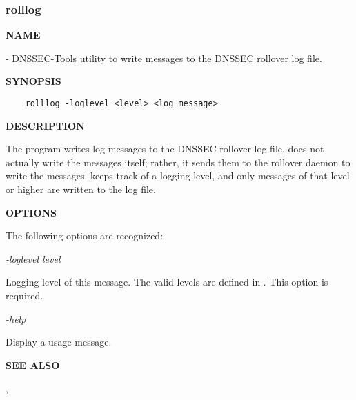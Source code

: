 \clearpage

\subsubsection{\bf rolllog}

{\bf NAME}

 - DNSSEC-Tools utility to write messages to the DNSSEC rollover
log file.

{\bf SYNOPSIS}

\begin{verbatim}
    rolllog -loglevel <level> <log_message>
\end{verbatim}

{\bf DESCRIPTION}

The  program writes log messages to the DNSSEC rollover log file.
 does not actually write the messages itself; rather, it sends
them to the  rollover daemon to write the messages.
 keeps track of a logging level, and only messages of that level
or higher are written to the log file.

{\bf OPTIONS}

The following options are recognized:

\begin{description}

\item {\it -loglevel level}\verb" "

Logging level of this message.  The valid levels are defined in
.   This option is required.

\item {\it -help}\verb" "

Display a usage message.

\end{description}

{\bf SEE ALSO}

,

